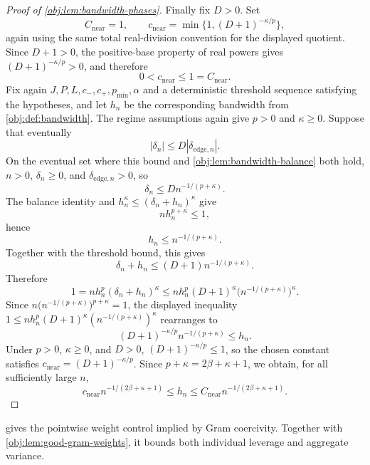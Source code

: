 \documentclass[11pt]{article}
\begin{document}
\begin{proof}[Proof of \cref{obj:lem:bandwidth-phases}]
Finally fix \(D>0\). Set
\[
C_{\mathrm{near}}=1,
\qquad
c_{\mathrm{near}}=\min\{1,(D+1)^{-\kappa/p}\},
\]
again using the same total real-division convention for the displayed quotient. Since \(D+1>0\), the positive-base property of real powers gives \((D+1)^{-\kappa/p}>0\), and therefore
\[
0<c_{\mathrm{near}}\le1=C_{\mathrm{near}}.
\]
Fix again \(J,P,L,c_-,c_+,p_{\min},\alpha\) and a deterministic threshold sequence satisfying the hypotheses, and let \(h_n\) be the corresponding bandwidth from \cref{obj:def:bandwidth}. The regime assumptions again give \(p>0\) and \(\kappa\ge0\). Suppose that eventually
\[
|\delta_n|\le D|\delta_{\mathrm{edge},n}|.
\]
On the eventual set where this bound and \cref{obj:lem:bandwidth-balance} both hold, \(n>0\), \(\delta_n\ge0\), and \(\delta_{\mathrm{edge},n}>0\), so
\[
\delta_n\le D n^{-1/(p+\kappa)}.
\]
The balance identity and \(h_n^\kappa\le(\delta_n+h_n)^\kappa\) give
\[
n h_n^{p+\kappa}\le1,
\]
hence
\[
h_n\le n^{-1/(p+\kappa)}.
\]
Together with the threshold bound, this gives
\[
\delta_n+h_n\le(D+1)n^{-1/(p+\kappa)}.
\]
Therefore
\[
1
=
n h_n^p(\delta_n+h_n)^\kappa
\le
n h_n^p (D+1)^\kappa\bigl(n^{-1/(p+\kappa)}\bigr)^\kappa .
\]
Since \(n\bigl(n^{-1/(p+\kappa)}\bigr)^{p+\kappa}=1\), the displayed inequality \(1\le n h_n^p (D+1)^\kappa (n^{-1/(p+\kappa)})^\kappa\) rearranges to
\[
(D+1)^{-\kappa/p}n^{-1/(p+\kappa)}\le h_n .
\]
Under \(p>0\), \(\kappa\ge0\), and \(D>0\), \((D+1)^{-\kappa/p}\le1\), so the chosen constant satisfies \(c_{\mathrm{near}}=(D+1)^{-\kappa/p}\). Since \(p+\kappa=2\beta+\kappa+1\), we obtain, for all sufficiently large \(n\),
\[
c_{\mathrm{near}}n^{-1/(2\beta+\kappa+1)}
\le
h_n
\le
C_{\mathrm{near}}n^{-1/(2\beta+\kappa+1)} .
\]
\end{proof}

 gives the pointwise weight control implied by Gram coercivity. Together with \cref{obj:lem:good-gram-weights}, it bounds both individual leverage and aggregate variance.
\end{document}
